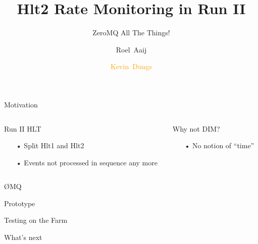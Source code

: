 \documentclass[aspectratio=1610,compress,titleprogressbar]{beamer}
\title{Hlt2 Rate Monitoring in Run II}
\subtitle{ZeroMQ All The Things!}
\author[K.~Dungs]{Roel~Aaij\inst{1} \and \textcolor{orange}{Kevin~Dungs\inst{2}}}
\institute{\inst{1} CERN \and \inst{2} TU Dortmund}
\begin{document}
\maketitle

\begin{frame}{Motivation}
  \begin{columns}[t]
    \begin{column}{.5\textwidth}
      \begin{block}{Run II HLT}
        \begin{itemize}
          \item [•] Split Hlt1 and Hlt2
          \item [•] Events not processed in sequence any more
        \end{itemize}
      \end{block}
    \end{column}
    \begin{column}{.5\textwidth}
      \begin{block}{Why not DIM?}
        \begin{itemize}
          \item [•] No notion of ``time''
        \end{itemize}
      \end{block}
    \end{column}
  \end{columns}
\end{frame}

\begin{frame}{ØMQ}
\end{frame}

\begin{frame}{Prototype}
\end{frame}

\begin{frame}{Testing on the Farm}
\end{frame}

\begin{frame}{What's next}
\end{frame}
\end{document}
